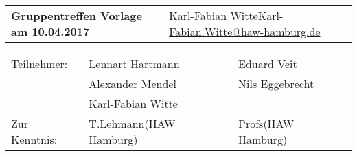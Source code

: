 \documentclass[
   draft=false
  ,paper=a4
  ,twoside=false
  ,fontsize=11pt
  ,headsepline
  ,DIV11
  ,parskip=full+
]{scrartcl} %
\begin{document}
\def\titel{Gruppentreffen Vorlage am 10.04.2017}

\def\myName{Karl-Fabian Witte}
\def\myEmail{Karl-Fabian.Witte@haw-hamburg.de}


\def\teilnehmer{ 
	& Lennart Hartmann & Eduard Veit \\
	& Alexander Mendel   & Nils Eggebrecht\\
    & Karl-Fabian Witte   & \\
}

\def\zurKenntnis {
	& T.Lehmann(HAW Hamburg) & Profs(HAW Hamburg) \\
}



\newlength{\txtw} %
\setlength{\txtw}{\textwidth} %
\addtolength{\txtw}{-10\tabcolsep} %

\def\me{\myName \newline \footnotesize{\url{\myEmail} } }

\def\tablehead{
	\hline 
	\rowcolor{tabgrey}
	\textbf{Nr.} & 
	\textbf{Art} & 
	\textbf{Stichwort und Beschreibung} & 
	\textbf{Wer} & 
	\textbf{Bis wann} \\
	\hline 
	\endhead}
\begin{tabular}{p{0.65\txtw} p{0.35\txtw}}
	\textbf{\Large{\titel}} & \me  \\
\end{tabular}

\begin{tabular}{l p{0.4\txtw} p{0.4\txtw} }
	Teilnehmer: \teilnehmer
	Zur Kenntnis: \zurKenntnis
\end{tabular}
\end{document}
